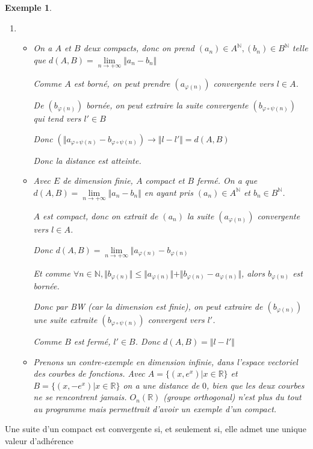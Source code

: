 \documentclass[a4paper,12pt]{book}
\newcommand{\Prop}[2]{\begin{tcolorbox}[sharp corners, colback=white,colframe=red!90!black!75, title=Proposition : #1]#2\end{tcolorbox}}
\newtheorem{Exe}{Exemple}[section]
\def\R{\mathbb{R}}
\def\N{\mathbb{N}}
\begin{document}
\begin{Exe}
\begin{enumerate}
\item \begin{itemize}
\item On a $A$ et $B$ deux compacts, donc on prend $(a_n)\in A^\N, (b_n)\in B^\N$ telle que $d(A,B)=\lim\limits_{n\to +\infty} \Vert a_n-b_n\Vert$ \par Comme $A$ est borné, on peut prendre $(a_{\varphi(n)})$ convergente vers $l\in A$. \par De $(b_{\varphi(n)})$ bornée, on peut extraire la suite convergente $(b_{\varphi\circ\psi(n)})$ qui tend vers $l'\in B$ \par Donc $\left(\Vert a_{\varphi\circ\psi(n)}-b_{\varphi\circ\psi(n)}\right)\to \Vert l-l'\Vert  = d(A,B)$ \par Donc la distance est atteinte.
\item Avec $E$ de dimension finie, $A$ compact et $B$ fermé. On a que $d(A,B)=\lim\limits_{n\to+\infty} \Vert a_n-b_n\Vert$ en ayant pris $(a_n)\in A^\N$ et $b_n\in B^\N$. \par $A$ est compact, donc on extrait de $(a_n)$ la suite $(a_{\varphi(n)})$ convergente vers $l\in A$. \par Donc $d(A,B)=\lim\limits_{n\to+\infty}\Vert a_{\varphi(n)}-b_{\varphi(n)}$ \par Et comme $\forall n\in\N, \Vert b_{\varphi(n)}\Vert\leq\Vert a_{\varphi(n)}\Vert +\Vert b_{\varphi(n)}-a_{\varphi(n)}\Vert$, alors $b_{\varphi(n)}$ est bornée. \par Donc par BW (car la dimension est finie), on peut extraire de $(b_{\varphi(n)})$ une suite extraite $(b_{\varphi\circ\psi(n)})$ convergent vers $l'$. \par Comme $B$ est fermé, $l'\in B$. Donc $d(A,B)=\Vert l-l'\Vert$
\item Prenons un contre-exemple en dimension infinie, dans l'espace vectoriel des courbes de fonctions. Avec $A = \{(x,e^x)\vert x\in\R\}$ et $B=\{(x,-e^x)\vert x\in\R\}$ on a une distance de $0$, bien que les deux courbes ne se rencontrent jamais. $O_n(\R)$ (groupe orthogonal) n'est plus du tout au programme mais permettrait d'avoir un exemple d'un compact.
\end{itemize}
\end{enumerate}
\end{Exe}
\Prop{Convergence d'une suite compacte}{Une suite d'un compact est convergente si, et seulement si, elle admet une unique valeur d'adhérence}
\end{document}
